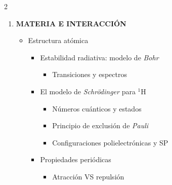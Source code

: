\documentclass[a4paper,14pt]{extarticle}
\newcommand*\chem[1]{\ensuremath{\mathrm{#1}}}
\begin{document}
\begin{multicols}{2}


\renewcommand{\labelitemi}{$\triangleright$}
\renewcommand{\labelitemii}{---}
\renewcommand{\labelitemiii}{}
	\begin{enumerate}
	
%
% 			
 		\item {\bfseries \footnotesize MATERIA E INTERACCIÓN}
 			\begin{itemize}[leftmargin=2mm]
				\item Estructura atómica
 					{\footnotesize
 					\begin{itemize}[leftmargin=6mm]
 						\item Estabilidad radiativa: modelo de \textit{Bohr}
 						{\footnotesize
 						\begin{itemize}[leftmargin=6mm]
 							\item Transiciones y espectros
 						\end{itemize}
 						}
 						\item El modelo de \textit{Schrödinger} para $\chem{^1H}$
 						{\footnotesize
 						\begin{itemize}[leftmargin=6mm]
 							\item Números cuánticos y estados
 							\item Principio de exclusión de \textit{Pauli}
 							\item Configuraciones polielectrónicas y {\scriptsize SP}
 						\end{itemize}
 						}
 						
 						\item Propiedades periódicas
 					 {
 							\begin{itemize}[leftmargin=6mm]
 								\item Atracción {\tiny VS} repulsión
 							\end{itemize}
 							}
 					

\end{itemize}}
\end{itemize}
\end{enumerate}
\end{multicols}
\end{document}

